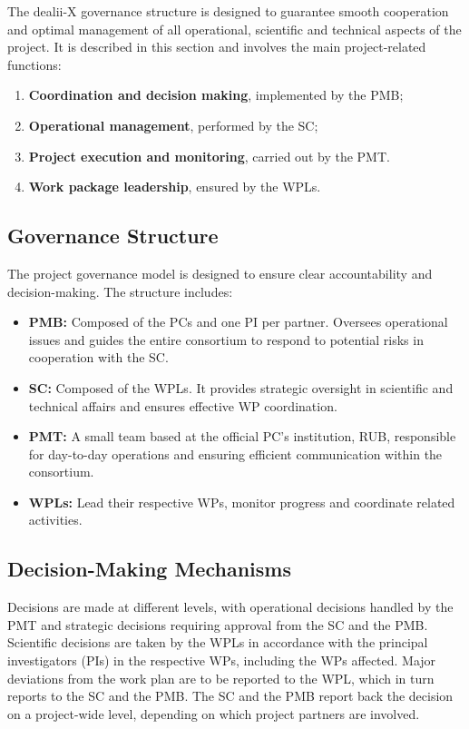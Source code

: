 \documentclass[a4paper,12pt]{article}
\begin{document}
The dealii-X governance structure is designed to guarantee smooth cooperation and optimal management of all operational, scientific and technical aspects of the project. It is described in this section and involves the main project-related functions:
\begin{enumerate}
	\item \textbf{Coordination and decision making}, implemented by the PMB;
	\item \textbf{Operational management}, performed by the SC;
        \item \textbf{Project execution and monitoring}, carried out by the PMT.
        \item \textbf{Work package leadership}, ensured by the WPLs.
\end{enumerate}

\subsection{\textcolor{EUblue}{Governance Structure}}
The project governance model is designed to ensure clear accountability and deci\-sion-making. The structure includes:
\begin{itemize}[left=2em, itemsep=1pt, topsep=0pt] 
    \item \textbf{PMB:} Composed of the PCs and one PI per partner. Oversees operational issues and guides the entire consortium to respond to potential risks in cooperation with the SC.
    \item \textbf{SC:} Composed of the WPLs. It provides strategic oversight in scientific and technical affairs and ensures effective WP coordination.
    \item \textbf{PMT:} A small team based at the official PC's institution, RUB, responsible for day-to-day operations and ensuring efficient communication within the consortium.
    \item \textbf{WPLs:} Lead their respective WPs, monitor progress and coordinate related activities.
\end{itemize}

\subsection{\textcolor{EUblue}{Decision-Making Mechanisms}}
Decisions are made at different levels, with operational decisions handled by the PMT and strategic decisions requiring approval from the SC and the PMB. Scientific decisions are taken by the WPLs in accordance with the principal investigators (PIs) in the respective WPs, including the WPs affected. Major deviations from the work plan are to be reported to the WPL, which in turn reports to the SC and the PMB. The SC and the PMB report back the decision on a project-wide level, depending on which project partners are involved. 
\end{document}
